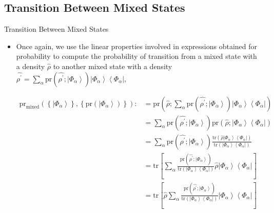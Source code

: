 \documentclass[9pt,handout]{beamer}
\newcommand{\pr}[0]{\text{pr}}
\newcommand{\tr}[0]{\text{tr}}
\begin{document}
\subsection{Transition Between Mixed States}
\begin{frame}{Transition Between Mixed States}
\begin{itemize}
\item Once again, we use the linear properties involved in expressions obtained for probability to compute the probability of transition from a mixed state with a density $\widehat{\rho}$ to another mixed state with a density $\displaystyle{\widehat{\rho^\prime} = \sum_\alpha \pr \left( \widehat{\rho^\prime}; \left\lvert \Phi_\alpha \right\rangle \right) \left\lvert \Phi_\alpha \right\rangle \left\langle \Phi_\alpha \right\rvert}$,

\begin{align*}
\pr_{\text{mixed}} \left( \left\{ \left\lvert \Phi_\alpha \right\rangle \right\}, \left\{ \pr \left( \left\lvert \Phi_\alpha \right\rangle \right) \right\} \right) : & = \pr \left( \widehat{\rho}; \sum_\alpha \pr \left( \widehat{\rho^\prime}; \left\lvert \Phi_\alpha \right\rangle \right) \left\lvert \Phi_\alpha \right\rangle \left\langle \Phi_\alpha \right\rvert \right) \\
& = \sum_\alpha \pr \left( \widehat{\rho^\prime}; \left\lvert \Phi_\alpha \right\rangle \right) \pr \left( \widehat{\rho}; \left\lvert \Phi_\alpha \right\rangle \left\langle \Phi_\alpha \right\rvert \right) \\
& = \sum_\alpha \pr \left( \widehat{\rho^\prime}; \left\lvert \Phi_\alpha \right\rangle \right) \frac{\tr \left( \widehat{\rho} \left\lvert \Phi_\alpha \right\rangle \left\langle \Phi_\alpha \right\rvert \right)}{\tr \left( \left\lvert \Phi_\alpha \right\rangle \left\langle \Phi_\alpha \right\rvert \right)} \\
& = \tr \left[ \sum_\alpha \frac{\pr \left( \widehat{\rho^\prime}; \left\lvert \Phi_\alpha \right\rangle \right)}{\tr \left( \left\lvert \Phi_\alpha \right\rangle \left\langle \Phi_\alpha \right\rvert \right)} \widehat{\rho} \left\lvert \Phi_\alpha \right\rangle \left\langle \Phi_\alpha \right\rvert \right] \\
& = \tr \left[ \widehat{\rho} \sum_\alpha \frac{\pr \left( \widehat{\rho^\prime}; \left\lvert \Phi_\alpha \right\rangle \right)}{\tr \left( \left\lvert \Phi_\alpha \right\rangle \left\langle \Phi_\alpha \right\rvert \right)} \left\lvert \Phi_\alpha \right\rangle \left\langle \Phi_\alpha \right\rvert \right]
\end{align*}
\end{itemize}
\end{frame}
\end{document}
